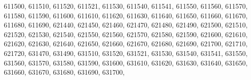 \textquotesingle{}611500\textquotesingle{}, \textquotesingle{}611510\textquotesingle{}, \textquotesingle{}611520\textquotesingle{}, \textquotesingle{}611521\textquotesingle{}, \textquotesingle{}611530\textquotesingle{}, \textquotesingle{}611540\textquotesingle{}, \textquotesingle{}611541\textquotesingle{}, \textquotesingle{}611550\textquotesingle{}, \textquotesingle{}611560\textquotesingle{}, \textquotesingle{}611570\textquotesingle{}, \textquotesingle{}611580\textquotesingle{}, \textquotesingle{}611590\textquotesingle{}, \textquotesingle{}611600\textquotesingle{}, \textquotesingle{}611610\textquotesingle{}, \textquotesingle{}611620\textquotesingle{}, \textquotesingle{}611630\textquotesingle{}, \textquotesingle{}611640\textquotesingle{}, \textquotesingle{}611650\textquotesingle{}, \textquotesingle{}611660\textquotesingle{}, \textquotesingle{}611670\textquotesingle{}, \textquotesingle{}611680\textquotesingle{}, \textquotesingle{}611690\textquotesingle{}, \textquotesingle{}621440\textquotesingle{}, \textquotesingle{}621450\textquotesingle{}, \textquotesingle{}621460\textquotesingle{}, \textquotesingle{}621470\textquotesingle{}, \textquotesingle{}621480\textquotesingle{}, \textquotesingle{}621490\textquotesingle{}, \textquotesingle{}621500\textquotesingle{}, \textquotesingle{}621510\textquotesingle{}, \textquotesingle{}621520\textquotesingle{}, \textquotesingle{}621530\textquotesingle{}, \textquotesingle{}621540\textquotesingle{}, \textquotesingle{}621550\textquotesingle{}, \textquotesingle{}621560\textquotesingle{}, \textquotesingle{}621570\textquotesingle{}, \textquotesingle{}621580\textquotesingle{}, \textquotesingle{}621590\textquotesingle{}, \textquotesingle{}621600\textquotesingle{}, \textquotesingle{}621610\textquotesingle{}, \textquotesingle{}621620\textquotesingle{}, \textquotesingle{}621630\textquotesingle{}, \textquotesingle{}621640\textquotesingle{}, \textquotesingle{}621650\textquotesingle{}, \textquotesingle{}621660\textquotesingle{}, \textquotesingle{}621670\textquotesingle{}, \textquotesingle{}621680\textquotesingle{}, \textquotesingle{}621690\textquotesingle{}, \textquotesingle{}621700\textquotesingle{}, \textquotesingle{}621710\textquotesingle{}, \textquotesingle{}621720\textquotesingle{}, \textquotesingle{}631470\textquotesingle{}, \textquotesingle{}631490\textquotesingle{}, \textquotesingle{}631510\textquotesingle{}, \textquotesingle{}631520\textquotesingle{}, \textquotesingle{}631521\textquotesingle{}, \textquotesingle{}631530\textquotesingle{}, \textquotesingle{}631540\textquotesingle{}, \textquotesingle{}631541\textquotesingle{}, \textquotesingle{}631550\textquotesingle{}, \textquotesingle{}631560\textquotesingle{}, \textquotesingle{}631570\textquotesingle{}, \textquotesingle{}631580\textquotesingle{}, \textquotesingle{}631590\textquotesingle{}, \textquotesingle{}631600\textquotesingle{}, \textquotesingle{}631610\textquotesingle{}, \textquotesingle{}631620\textquotesingle{}, \textquotesingle{}631630\textquotesingle{}, \textquotesingle{}631640\textquotesingle{}, \textquotesingle{}631650\textquotesingle{}, \textquotesingle{}631660\textquotesingle{}, \textquotesingle{}631670\textquotesingle{}, \textquotesingle{}631680\textquotesingle{}, \textquotesingle{}631690\textquotesingle{}, \textquotesingle{}631700\textquotesingle{}, 